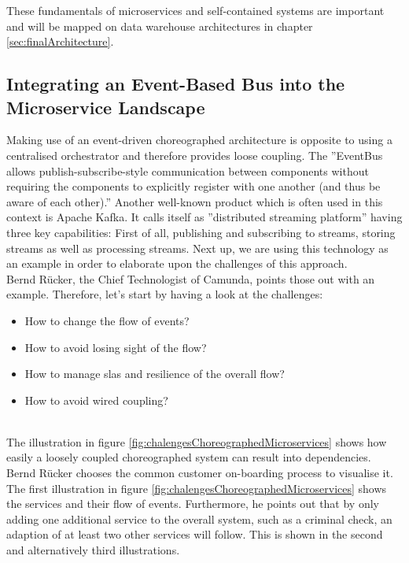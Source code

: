 These fundamentals of microservices and self-contained systems are important and will be mapped on data warehouse architectures in chapter \ref{sec:finalArchitecture}.

\subsection{Integrating an Event-Based Bus into the Microservice  Landscape}
\label{sec:eventBasedArchitecture}
Making use of an event-driven choreographed architecture is opposite to using a centralised orchestrator and therefore provides loose coupling. The ''EventBus allows publish-subscribe-style communication between components without requiring the components to explicitly register with one another (and thus be aware of each other).'' \cite{EventBusExplained} \newline
Another well-known product which is often used in this context is Apache Kafka. It calls itself as ''distributed streaming platform'' having three key capabilities: First of all, publishing and subscribing to streams, storing streams as well as processing streams.\cite{kafka}
Next up, we are using this technology as an example in order to elaborate upon the challenges of this approach.\newline
\\
Bernd Rücker, the Chief Technologist of Camunda, points those out with an example. Therefore, let's start by having a look at the challenges:
\begin{itemize}
    \item How to change the flow of events?
    \item How to avoid losing sight of the flow?
    \item How to manage \acrshort{sla}s and resilience of the overall flow?
    \item How to avoid wired coupling?
\end{itemize}
\cite{eventDrivenMicroservices}\newline
\\
The illustration in figure \ref{fig:chalengesChoreographedMicroservices} shows how easily a loosely coupled choreographed system can result into dependencies. Bernd Rücker chooses the common customer on-boarding process to visualise it. The first illustration in figure \ref{fig:chalengesChoreographedMicroservices} shows the services and their flow of events. Furthermore, he points out that by only adding one additional service to the overall system, such as a criminal check, an adaption of at least two other services will follow. This is shown in the second and alternatively third illustrations.\cite{eventDrivenMicroservices}\newline
